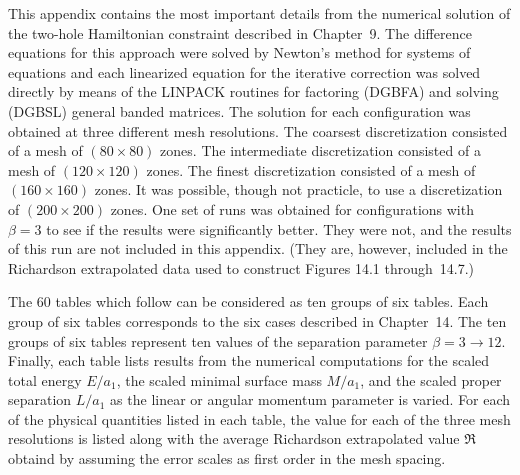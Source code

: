 This appendix contains the most important details from the numerical solution
of the two-hole Hamiltonian constraint described in Chapter~9.  The difference
equations for this approach were solved by Newton's method for systems of
equations and each linearized equation for the iterative correction was solved
directly by means of the LINPACK routines for factoring (DGBFA) and solving
(DGBSL) general banded matrices.  The solution for each configuration was
obtained at three different mesh resolutions.  The coarsest discretization
consisted of a mesh of $(80\times80)$ zones.  The intermediate discretization
consisted of a mesh of $(120\times120)$ zones.  The finest discretization
consisted of a mesh of $(160\times160)$ zones.  It was possible, though not
practicle, to use a discretization of $(200\times200)$ zones.  One set of runs
was obtained for configurations with $\beta=3$ to see if the results were
significantly better.  They were not, and the results of this run are not
included in this appendix.  (They are, however, included in the Richardson
extrapolated data used to construct Figures 14.1 through~14.7.)

The 60 tables which follow can be considered as ten groups of six tables.  Each
group of six tables corresponds to the six cases described in Chapter~14.  The
ten groups of six tables represent ten values of the separation parameter
$\beta=3\to12$.  Finally, each table lists results from the numerical
computations for the scaled total energy $E/a_1$, the scaled minimal surface
mass $M/a_1$, and the scaled proper separation $L/a_1$ as the linear or angular
momentum parameter is varied.  For each of the physical quantities listed in
each table, the value for each of the three mesh resolutions is listed along
with the  average Richardson extrapolated value $\Re$ obtaind by assuming the
error scales as first order in the mesh spacing.

\vfill
\eject











